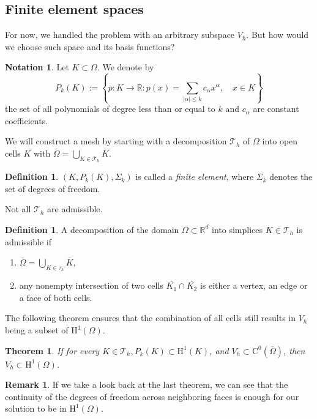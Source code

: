 \documentclass[12pt,a4paper,twoside, open=right]{scrreprt}
\theoremstyle{definition}
\newtheorem{rem}[auf]{Remark}
\newtheorem{defn}[auf]{Definition}
\newtheorem{notation}[auf]{Notation}
\theoremstyle{plain}
\newtheorem{sa}[auf]{Theorem}
\newcommand{\abs}[1]{\left\vert #1\right\vert}
\newcommand{\rr}{\mathbb{R}}
\begin{document}
\subsection{Finite element spaces}
\label{subsec:finitelem}
For now, we handled the problem with an arbitrary subspace $V_h$. But how would we choose such space and its basis functions?
\begin{notation}
    Let $K\subset \Omega$. We denote by
    \begin{equation}
        P_k(K):=\left\{p\colon K\to\rr\colon p(x)=\sum_{\abs{\alpha}\le k}c_\alpha x^\alpha,\quad x\in K\right\}
    \end{equation}
    the set of all polynomials of degree less than or equal to $k$ and $c_\alpha$ are constant coefficients.
\end{notation}
We will construct a mesh by starting with a decomposition $\mathcal{T}_h$ of $\Omega$ into open cells $K$ with $\overline{\Omega}=\bigcup_{K\in\mathcal{T}_h}\overline{K}$.
\begin{defn}
    $(K,P_k(K),\Sigma_k)$ is called a \emph{finite element}, where $\Sigma_k$ denotes the set of degrees of freedom.
\end{defn}
   Not all $\mathcal{T}_h$ are admissible.
\begin{defn}
    A decomposition of the domain $\Omega\subset\rr^d$ into simplices $K\in\mathcal{T}_h$ is admissible if
    \begin{enumerate}
        \item $\overline{\Omega}=\bigcup_{K\in\tau_h}\overline{K}$,
        \item any nonempty intersection of two cells $\overline{K_1}\cap\overline{K_2}$ is either a vertex, an edge or a face of both cells.
    \end{enumerate}
\end{defn}
The following theorem ensures that the combination of all cells still results in $V_h$ being a subset of $\mathrm{H}^1(\Omega)$.
\begin{sa}
    If for every $K\in\mathcal{T}_h,P_k(K)\subset \mathrm{H}^1(K)$, and $V_h\subset \mathrm{C}^0(\overline\Omega)$, then $V_h\subset \mathrm{H}^1(\Omega)$.
\end{sa}
\begin{rem}
    If we take a look back at the last theorem, we can see that the continuity of the degrees of freedom across neighboring faces is enough for our solution to be in $\mathrm{H}^1(\Omega)$. 
\end{rem}
\end{document}
